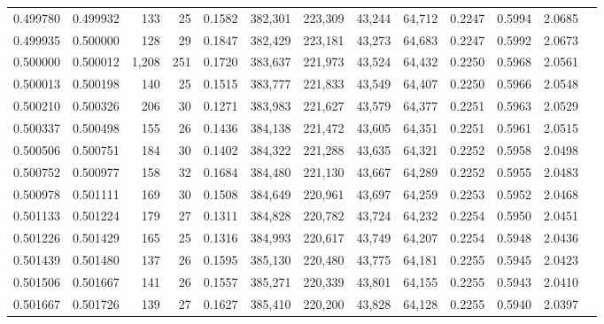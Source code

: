 \begin{tabular}{rrrrrrrrrrrrr}
0.499780 & 0.499932 &    133 &    25 &                                     0.1582 & 382,301 & 223,309 &  43,244 &  64,712 & 0.2247 & 0.5994 & 2.0685 \\
0.499935 & 0.500000 &    128 &    29 &                                     0.1847 & 382,429 & 223,181 &  43,273 &  64,683 & 0.2247 & 0.5992 & 2.0673 \\
0.500000 & 0.500012 &  1,208 &   251 &                                     0.1720 & 383,637 & 221,973 &  43,524 &  64,432 & 0.2250 & 0.5968 & 2.0561 \\
0.500013 & 0.500198 &    140 &    25 &                                     0.1515 & 383,777 & 221,833 &  43,549 &  64,407 & 0.2250 & 0.5966 & 2.0548 \\
0.500210 & 0.500326 &    206 &    30 &                                     0.1271 & 383,983 & 221,627 &  43,579 &  64,377 & 0.2251 & 0.5963 & 2.0529 \\
0.500337 & 0.500498 &    155 &    26 &                                     0.1436 & 384,138 & 221,472 &  43,605 &  64,351 & 0.2251 & 0.5961 & 2.0515 \\
0.500506 & 0.500751 &    184 &    30 &                                     0.1402 & 384,322 & 221,288 &  43,635 &  64,321 & 0.2252 & 0.5958 & 2.0498 \\
0.500752 & 0.500977 &    158 &    32 &                                     0.1684 & 384,480 & 221,130 &  43,667 &  64,289 & 0.2252 & 0.5955 & 2.0483 \\
0.500978 & 0.501111 &    169 &    30 &                                     0.1508 & 384,649 & 220,961 &  43,697 &  64,259 & 0.2253 & 0.5952 & 2.0468 \\
0.501133 & 0.501224 &    179 &    27 &                                     0.1311 & 384,828 & 220,782 &  43,724 &  64,232 & 0.2254 & 0.5950 & 2.0451 \\
0.501226 & 0.501429 &    165 &    25 &                                     0.1316 & 384,993 & 220,617 &  43,749 &  64,207 & 0.2254 & 0.5948 & 2.0436 \\
0.501439 & 0.501480 &    137 &    26 &                                     0.1595 & 385,130 & 220,480 &  43,775 &  64,181 & 0.2255 & 0.5945 & 2.0423 \\
0.501506 & 0.501667 &    141 &    26 &                                     0.1557 & 385,271 & 220,339 &  43,801 &  64,155 & 0.2255 & 0.5943 & 2.0410 \\
0.501667 & 0.501726 &    139 &    27 &                                     0.1627 & 385,410 & 220,200 &  43,828 &  64,128 & 0.2255 & 0.5940 & 2.0397 \\

\end{tabular}
